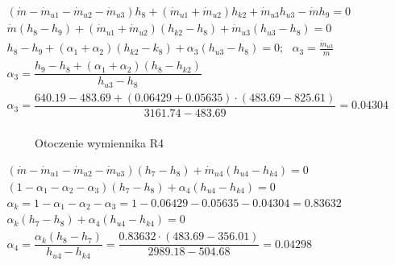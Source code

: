 \begin{math}
	\begin{array}{l}
		(\dot m - \dot m_{u1} - \dot m_{u2} - \dot m_{u3}) h_8
			+ (\dot m_{u1} + \dot m_{u2}) h_{k2} + \dot m_{u3} h_{u3}
			- \dot m h_9 = 0 \\
		\dot m ( h_8 - h_9 ) + (\dot m_{u1} + \dot m_{u2})(h_{k2} - h_8)
			+ \dot m_{u3} (h_{u3} - h_8) = 0 \\
		h_8 - h_9 + (\alpha_1 + \alpha_2)(h_{k2} - k_8)
			+ \alpha_3 (h_{u3} - h_8) = 0;
			~~~ \alpha_3 = \frac{\dot m_{u3}}{\dot m} \\

		\alpha_3 = \dfrac{h_9 - h_8 + (\alpha_1 + \alpha_2)(h_8 - h_{k2})
				}{h_{u3} - h_8} \\
		\alpha_3 = \dfrac{\num{640,19} - \num{483,69} + (\num{0,06429}
				+ \num{0,05635}) \cdot (\num{483,69} - \num{825,61})
				}{\num{3161,74} - \num{483,69}} = \num{0,04304} \\
	\end{array}
\end{math}

\begin{figure}[H]
	\centering

	\caption{Otoczenie wymiennika R4}
\end{figure}

\begin{math}
	\begin{array}{l}
		(\dot m - \dot m_{u1} - \dot m_{u2} - \dot m_{u3})
			( h_{7} - h_{8} ) + \dot m_{u4} ( h_{u4} - h_{k4} ) = 0 \\
		(1 - \alpha_1 - \alpha_2 - \alpha_3)( h_7 - h_8 )
			+ \alpha_4 ( h_{u4} - h_{k4} ) = 0 \\

		\alpha_k = 1 - \alpha_1 - \alpha_2 - \alpha_3
			= 1 - \num{0,06429} - \num{0,05635} - \num{0,04304}
			= \num{0,83632} \\
		\alpha_k ( h_7 - h_8 ) + \alpha_4 ( h_{u4} - h_{k4} ) = 0 \\

		\alpha_4 = \dfrac{\alpha_k ( h_8 - h_7 )}{ h_{u4} - h_{k4} }
			= \dfrac{\num{0,83632} \cdot ( \num{483,69} - \num{356,01} )
				}{ \num{2989,18} - \num{504,68} }
			= \num{0,04298} \\
	\end{array}
\end{math}

